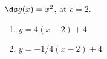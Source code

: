 {$\ds g(x) = x^2$, at $c=2$.
}
{\begin{enumerate}
\item		$y = 4(x-2)+4$
\item		$y = -1/4(x-2)+4$
\end{enumerate}
}
